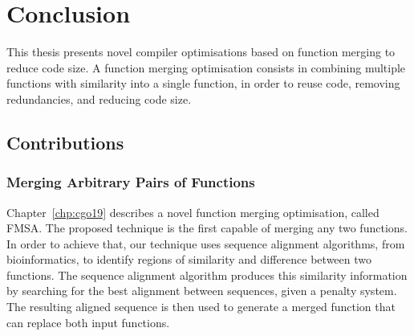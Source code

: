 
\chapter{Conclusion} \label{chp:conclusion}


This thesis presents novel compiler optimisations based on function merging to reduce code size.
A function merging optimisation consists in combining multiple functions with similarity into a single function, in order to reuse code, removing redundancies, and reducing code size.




\section{Contributions} \label{sec:conclusion:contribution}

\subsection{Merging Arbitrary Pairs of Functions}

Chapter~\ref{chp:cgo19} describes a novel function merging optimisation, called FMSA.
The proposed technique is the first capable of merging any two functions.
In order to achieve that, our technique uses sequence alignment algorithms, from bioinformatics, to identify regions of similarity and difference between two functions.
The sequence alignment algorithm produces this similarity information by searching for the best alignment between sequences, given a penalty system. 
The resulting aligned sequence is then used to generate a merged function that can replace both input functions.

